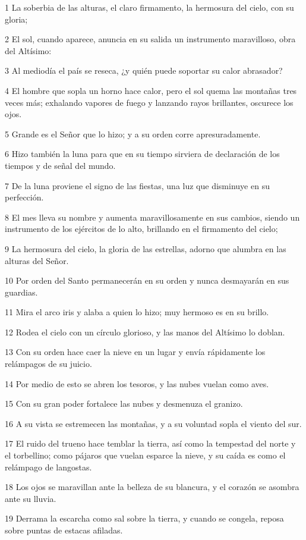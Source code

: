 \par 1 La soberbia de las alturas, el claro firmamento, la hermosura del cielo, con su gloria;
\par 2 El sol, cuando aparece, anuncia en su salida un instrumento maravilloso, obra del Altísimo:
\par 3 Al mediodía el país se reseca, ¿y quién puede soportar su calor abrasador?
\par 4 El hombre que sopla un horno hace calor, pero el sol quema las montañas tres veces más; exhalando vapores de fuego y lanzando rayos brillantes, oscurece los ojos.
\par 5 Grande es el Señor que lo hizo; y a su orden corre apresuradamente.
\par 6 Hizo también la luna para que en su tiempo sirviera de declaración de los tiempos y de señal del mundo.
\par 7 De la luna proviene el signo de las fiestas, una luz que disminuye en su perfección.
\par 8 El mes lleva su nombre y aumenta maravillosamente en sus cambios, siendo un instrumento de los ejércitos de lo alto, brillando en el firmamento del cielo;
\par 9 La hermosura del cielo, la gloria de las estrellas, adorno que alumbra en las alturas del Señor.
\par 10 Por orden del Santo permanecerán en su orden y nunca desmayarán en sus guardias.
\par 11 Mira el arco iris y alaba a quien lo hizo; muy hermoso es en su brillo.
\par 12 Rodea el cielo con un círculo glorioso, y las manos del Altísimo lo doblan.
\par 13 Con su orden hace caer la nieve en un lugar y envía rápidamente los relámpagos de su juicio.
\par 14 Por medio de esto se abren los tesoros, y las nubes vuelan como aves.
\par 15 Con su gran poder fortalece las nubes y desmenuza el granizo.
\par 16 A su vista se estremecen las montañas, y a su voluntad sopla el viento del sur.
\par 17 El ruido del trueno hace temblar la tierra, así como la tempestad del norte y el torbellino; como pájaros que vuelan esparce la nieve, y su caída es como el relámpago de langostas.
\par 18 Los ojos se maravillan ante la belleza de su blancura, y el corazón se asombra ante su lluvia.
\par 19 Derrama la escarcha como sal sobre la tierra, y cuando se congela, reposa sobre puntas de estacas afiladas.
